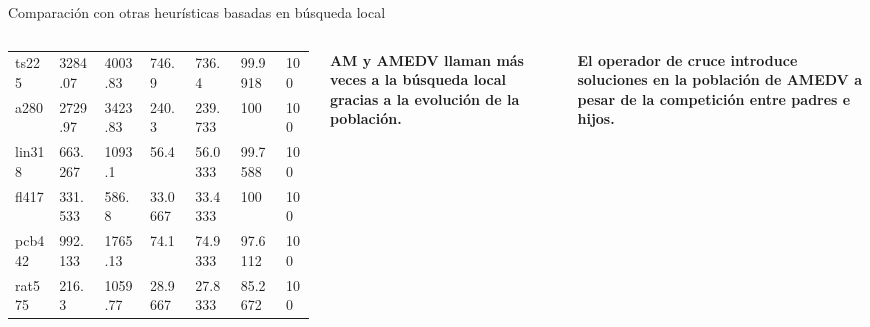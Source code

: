 \begin{frame}{\fontsize{14}{8}\selectfont Comparación con otras heurísticas basadas en búsqueda local}
\begin{columns}[c]
\begin{table}[H]
\begin{tabular}{lllllll}
		        		ts225    & 3284.07 & 4003.83 & 746.9 & 736.4 & 99.9918 & 100    \\
		        		a280     & 2729.97 & 3423.83 & 240.3 & 239.733 & 100 & 100    \\
		        		lin318   & 663.267 & 1093.1 & 56.4 & 56.0333 & 99.7588 & 100    \\
		        		fl417    & 331.533 & 586.8 & 33.0667 & 33.4333 & 100 & 100    \\
		        		pcb442   & 992.133 & 1765.13 & 74.1 & 74.9333 & 97.6112 & 100    \\
		        		rat575   & 216.3 & 1059.77 & 28.9667 & 27.8333 & 85.2672 & 100    \\
		        		\bottomrule
		        	\end{tabular}
		        \end{table}				

				\kern 1.5cm
				
				\fontsize{6}{8}\selectfont								
				\begin{tcolorbox}[colback=blue!5,colframe=blue!30]
					\color{blue!80} \textbf{AM y AMEDV llaman más veces a la búsqueda local gracias a la evolución de la población.}
				\end{tcolorbox}
				
				\begin{tcolorbox}[colback=blue!5,colframe=blue!30]
					\color{blue!80} \textbf{El operador de cruce introduce soluciones en la población de AMEDV a pesar de la competición entre padres e hijos.}
				\end{tcolorbox}	
			\end{columns}
			
		\end{frame}